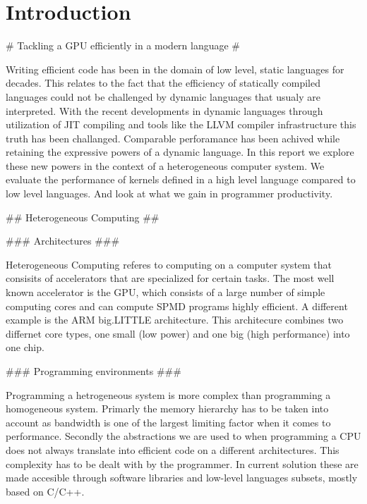 
\chapter{Introduction}





\begin{markdown}
# Tackling a GPU efficiently in a modern language #

Writing efficient code has been in the domain of low level, static
languages for decades. This relates to the fact that the efficiency of
statically compiled languages could not be challenged by dynamic
languages that usualy are interpreted.  With the recent developments
in dynamic languages through utilization of \gls{JIT} compiling and
tools like the \gls{LLVM} \cite{llvm} compiler infrastructure this
truth has been challanged. Comparable perforamance has been achived
while retaining the expressive powers of a dynamic language. In this
report we explore these new powers in the context of a heterogeneous
computer system. We evaluate the performance of kernels defined in a
high level language compared to low level languages. And look at what
we gain in programmer productivity.

## Heterogeneous Computing ##

### Architectures ###

Heterogeneous Computing referes to computing on a computer system that
consisits of accelerators that are specialized for certain tasks. The
most well known accelerator is the \gls{GPU}, which consists of a
large number of simple computing cores and can compute \gls{SPMD}
programs highly efficient. A different example is the ARM big.LITTLE
\cite{big.LITTLE} architecture. This architecure combines two
differnet core types, one small (low power) and one big (high
performance) into one chip.

### Programming environments ###

Programming a hetrogeneous system is more complex than programming a
homogeneous system. Primarly the memory hierarchy has to be taken into
account as bandwidth is one of the largest limiting factor when it
comes to performance. Secondly the abstractions we are used to when
programming a CPU does not always translate into efficient code on a
different architectures. This complexity has to be dealt with by the
programmer. In current solution these are made accesible through
software libraries and low-level languages subsets, mostly based on
C/C++.


\end{markdown}
